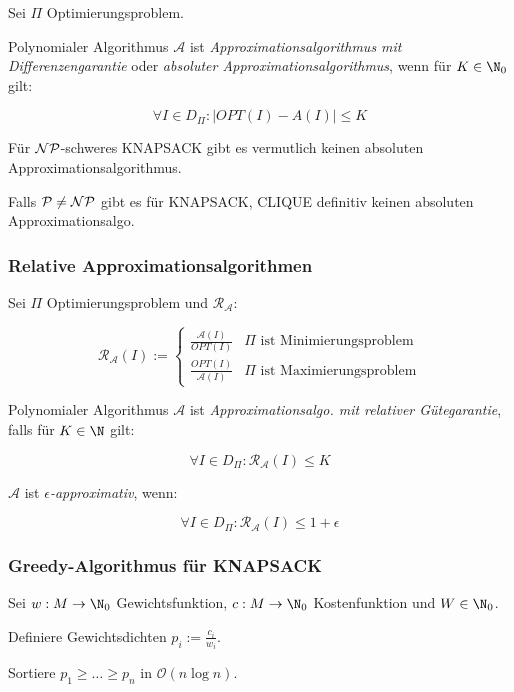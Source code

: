 Sei $\Pi$ Optimierungsproblem.

Polynomialer Algorithmus $\mathcal{A}$ ist \emph{Approximationsalgorithmus mit Differenzengarantie} oder \emph{absoluter Approximationsalgorithmus}, wenn für $K \in \N_0$ gilt:

\vspace*{-2mm}
\[ \forall I \in D_\Pi : | OPT(I) - A(I) | \leq K \]

Für $\mathcal{NP}$-schweres KNAPSACK gibt es vermutlich keinen absoluten Approximationsalgorithmus.

Falls $\mathcal{P} \neq \mathcal{NP}$ gibt es für KNAPSACK, CLIQUE definitiv keinen absoluten Approximationsalgo.

\subsubsection*{Relative Approximationsalgorithmen}

Sei $\Pi$ Optimierungsproblem und $\mathcal{R_A}$:

\vspace*{-4mm}
\[ \mathcal{R_A}(I) := \begin{cases} \frac{\mathcal{A}(I)}{OPT(I)} & \Pi \text{ ist Minimierungsproblem} \\ \frac{OPT(I)}{\mathcal{A}(I)} & \Pi \text{ ist Maximierungsproblem} \end{cases} \]

Polynomialer Algorithmus $\mathcal{A}$ ist \emph{Approximationsalgo. mit relativer Gütegarantie}, falls für $K \in \N$ gilt:

\vspace*{-2mm}
\[ \forall I \in D_\Pi : \mathcal{R_A}(I) \leq K \]

$\mathcal{A}$ ist \emph{$\epsilon$-approximativ}, wenn:

\vspace*{-2mm}
\[ \forall I \in D_\Pi : \mathcal{R_A}(I) \leq 1 + \epsilon \]

\subsubsection*{Greedy-Algorithmus für KNAPSACK}

Sei $w : M \to \N_0$ Gewichtsfunktion, $c : M \to \N_0$ Kostenfunktion und $W \in \N_0$.

\spacing

Definiere Gewichtsdichten $p_i := \frac{c_i}{w_i}$.

Sortiere $p_1 \geq \dots \geq p_n$ in $\mathcal{O}(n \log n)$.

